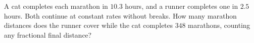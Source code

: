 A cat completes each marathon in $10.3$ hours, and a runner completes one in $2.5$ hours. Both continue at constant rates without breaks. How many marathon distances does the runner cover while the cat completes $348$ marathons, counting any fractional final distance?
